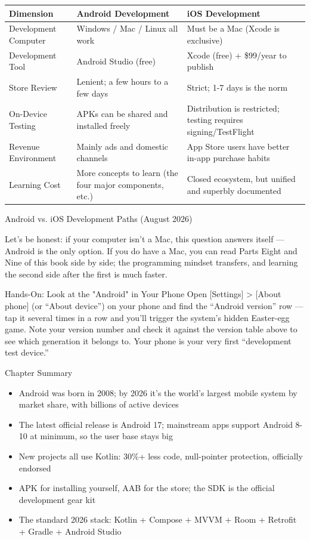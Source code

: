 \begin{center}
\begin{tabularx}{\linewidth}{|X|X|X|}
\hline
\textbf{Dimension} & \textbf{Android Development} & \textbf{iOS Development} \tabularnewline
\hline
Development Computer & Windows / Mac / Linux all work & Must be a Mac (Xcode is exclusive) \tabularnewline
Development Tool & Android Studio (free) & Xcode (free) + \$99/year to publish \tabularnewline
Store Review & Lenient; a few hours to a few days & Strict; 1-7 days is the norm \tabularnewline
On-Device Testing & APKs can be shared and installed freely & Distribution is restricted; testing requires signing/TestFlight \tabularnewline
Revenue Environment & Mainly ads and domestic channels & App Store users have better in-app purchase habits \tabularnewline
Learning Cost & More concepts to learn (the four major components, etc.) & Closed ecosystem, but unified and superbly documented \tabularnewline
\hline
\end{tabularx}
\end{center}

\begin{center}\small\color{gray}Android vs. iOS Development Paths (August 2026)\end{center}

Let's be honest: if your computer isn't a Mac, this question answers itself — Android is the only option. If you do have a Mac, you can read Parts Eight and Nine of this book side by side; the programming mindset transfers, and learning the second side after the first is much faster.

\begin{tcbpractice}{Hands-On: Look at the "Android" in Your Phone}
Open [Settings] > [About phone] (or “About device”) on your phone and find the “Android version” row — tap it several times in a row and you'll trigger the system's hidden Easter-egg game. Note your version number and check it against the version table above to see which generation it belongs to. Your phone is your very first “development test device.”

\end{tcbpractice}

\begin{tcbsummary}{Chapter Summary}
\begin{itemize}
  \item Android was born in 2008; by 2026 it's the world's largest mobile system by market share, with billions of active devices
  \item The latest official release is Android 17; mainstream apps support Android 8-10 at minimum, so the user base stays big
  \item New projects all use Kotlin: 30\%+ less code, null-pointer protection, officially endorsed
  \item APK for installing yourself, AAB for the store; the SDK is the official development gear kit
  \item The standard 2026 stack: Kotlin + Compose + MVVM + Room + Retrofit + Gradle + Android Studio
\end{itemize}

\end{tcbsummary}
